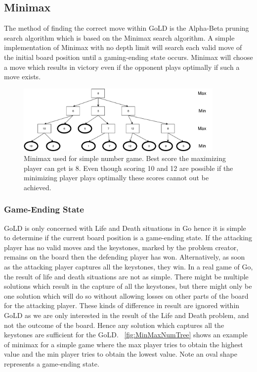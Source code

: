 \documentclass{l4proj}
\begin{document}
\subsection{Minimax}
The method of finding the correct move within GoLD is the Alpha-Beta pruning search algorithm which is based on the Minimax search algorithm. A simple implementation of Minimax with no depth limit will search each valid move of the initial board position until a gaming-ending state occurs. Minimax will choose a move which results in victory even if the opponent plays optimally if such a move exists.

\begin{figure}[!ht]
\centering
\includegraphics[width=0.9\textwidth]{MinMaxNumTree.pdf}
\caption{Minimax used for simple number game. Best score the maximizing player can get is 8. Even though scoring 10 and 12 are possible if the minimizing player plays optimally these scores cannot out be achieved.}
\label{fig:MinMaxNumTree}
\end{figure}

\subsubsection{Game-Ending State}
GoLD is only concerned with Life and Death situations in Go hence it is simple to determine if the current board position is a game-ending state. If the attacking player has no valid moves and the keystones, marked by the problem creator, remains on the board then the defending player has won. Alternatively, as soon as the attacking player captures all the keystones, they win. In a real game of Go, the result of life and death situations are not as simple. There might be multiple solutions which result in the capture of all the keystones, but there might only be one solution which will do so without allowing losses on other parts of the board for the attacking player. These kinds of difference in result are ignored within GoLD as we are only interested in the result of the Life and Death problem, and not the outcome of the board. Hence any solution which captures all the keystones are sufficient for the GoLD. ~\autoref{fig:MinMaxNumTree} shows an example of minimax for a simple game where the max player tries to obtain the highest value and the min player tries to obtain the lowest value. Note an oval shape represents a game-ending state.
\end{document}
